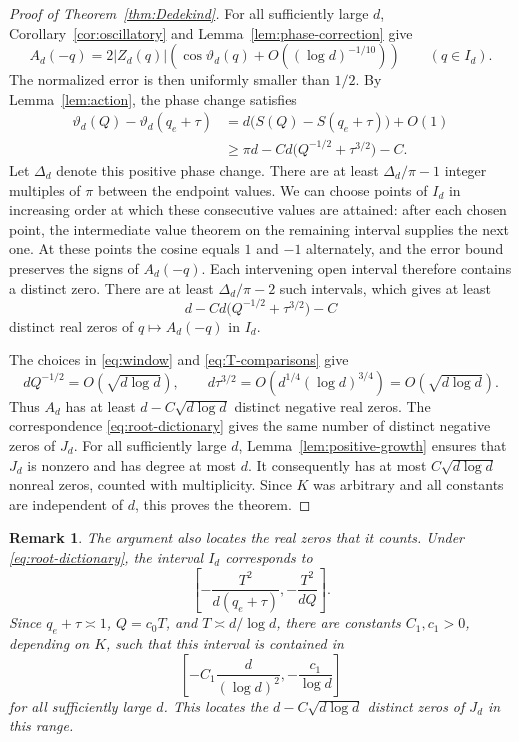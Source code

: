 \documentclass[11pt,reqno]{amsart}
\numberwithin{equation}{section}
\newtheorem{remark}[theorem]{Remark}
\begin{document}
\begin{proof}[Proof of Theorem~\ref{thm:Dedekind}]
For all sufficiently large $d$, Corollary~\ref{cor:oscillatory} and
Lemma~\ref{lem:phase-correction} give
\[
 A_d(-q)=2|Z_d(q)|
  \left(\cos\vartheta_d(q)+O((\log d)^{-1/10})\right)
 \qquad(q\in I_d).
\]
The normalized error is then uniformly smaller than $1/2$.
By Lemma~\ref{lem:action}, the phase change satisfies
\begin{align*}
 \vartheta_d(Q)-\vartheta_d(q_e+\tau)
 &=d\bigl(S(Q)-S(q_e+\tau)\bigr)+O(1)\\
 &\ge \pi d-Cd\bigl(Q^{-1/2}+\tau^{3/2}\bigr)-C.
\end{align*}
Let $\Delta_d$ denote this positive phase change. There are at
least $\Delta_d/\pi-1$ integer multiples of $\pi$ between the
endpoint values. We can choose points of $I_d$ in increasing order
at which these consecutive values are attained: after each chosen
point, the intermediate value theorem on the remaining interval
supplies the next one. At these points the cosine equals $1$ and
$-1$ alternately, and the error bound preserves the signs of
$A_d(-q)$. Each intervening open interval therefore contains a
distinct zero. There are at least $\Delta_d/\pi-2$ such intervals,
which gives at least
\begin{equation}\label{eq:root-count-before-scale}
 d-Cd\bigl(Q^{-1/2}+\tau^{3/2}\bigr)-C
\end{equation}
distinct real zeros of $q\mapsto A_d(-q)$ in $I_d$.

The choices in \eqref{eq:window} and
\eqref{eq:T-comparisons} give
\[
 dQ^{-1/2}=O(\sqrt{d\log d}),\qquad
 d\tau^{3/2}=O\!\left(d^{1/4}(\log d)^{3/4}\right)
             =O(\sqrt{d\log d}).
\]
Thus $A_d$ has at least $d-C\sqrt{d\log d}$ distinct negative
real zeros. The correspondence \eqref{eq:root-dictionary} gives the same
number of distinct negative zeros of $J_d$. For all sufficiently
large $d$, Lemma~\ref{lem:positive-growth} ensures that $J_d$ is
nonzero and has degree at most $d$. It consequently has at most
$C\sqrt{d\log d}$ nonreal zeros, counted with multiplicity.
Since $K$ was arbitrary and all constants are independent of $d$,
this proves the theorem.
\end{proof}



\begin{remark}
The argument also locates the real zeros that it counts. Under
\eqref{eq:root-dictionary}, the interval $I_d$ corresponds to
\[
 \left[-\frac{T^2}{d(q_e+\tau)},-\frac{T^2}{dQ}\right].
\]
Since $q_e+\tau\asymp1$, $Q=c_0T$, and $T\asymp d/\log d$,
there are constants $C_1,c_1>0$, depending on $K$, such that this interval
is contained in
\[
 \left[-C_1\frac{d}{(\log d)^2},-\frac{c_1}{\log d}\right]
\]
for all sufficiently large $d$. This locates the
$d-C\sqrt{d\log d}$ distinct zeros of $J_d$ in this range.
\end{remark}
\end{document}
